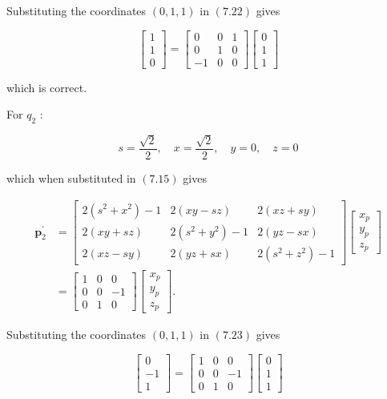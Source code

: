 Substituting the coordinates $(0,1,1)$ in $(7.22)$ gives

$$
\left[\begin{array}{l}
1 \\
1 \\
0
\end{array}\right]=\left[\begin{array}{ccc}
0 & 0 & 1 \\
0 & 1 & 0 \\
-1 & 0 & 0
\end{array}\right]\left[\begin{array}{l}
0 \\
1 \\
1
\end{array}\right]
$$

which is correct.

For $q_{2}$ :

$$
s=\frac{\sqrt{2}}{2}, \quad x=\frac{\sqrt{2}}{2}, \quad y=0, \quad z=0
$$

which when substituted in $(7.15)$ gives

$$
\begin{aligned}
\mathbf{p}_{2}^{\prime} & =\left[\begin{array}{ccc}
2\left(s^{2}+x^{2}\right)-1 & 2(x y-s z) & 2(x z+s y) \\
2(x y+s z) & 2\left(s^{2}+y^{2}\right)-1 & 2(y z-s x) \\
2(x z-s y) & 2(y z+s x) & 2\left(s^{2}+z^{2}\right)-1
\end{array}\right]\left[\begin{array}{l}
x_{p} \\
y_{p} \\
z_{p}
\end{array}\right] \\
& =\left[\begin{array}{ccc}
1 & 0 & 0 \\
0 & 0 & -1 \\
0 & 1 & 0
\end{array}\right]\left[\begin{array}{c}
x_{p} \\
y_{p} \\
z_{p}
\end{array}\right] .
\end{aligned}
$$

Substituting the coordinates $(0,1,1)$ in $(7.23)$ gives

$$
\left[\begin{array}{c}
0 \\
-1 \\
1
\end{array}\right]=\left[\begin{array}{ccc}
1 & 0 & 0 \\
0 & 0 & -1 \\
0 & 1 & 0
\end{array}\right]\left[\begin{array}{l}
0 \\
1 \\
1
\end{array}\right]
$$

